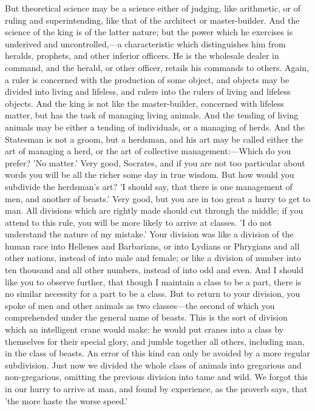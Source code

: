 \documentclass[11pt,letter]{article}
\begin{document}
\par  But theoretical science may be a science either of judging, like arithmetic, or of ruling and superintending, like that of the architect or master-builder. And the science of the king is of the latter nature; but the power which he exercises is underived and uncontrolled,—a characteristic which distinguishes him from heralds, prophets, and other inferior officers. He is the wholesale dealer in command, and the herald, or other officer, retails his commands to others. Again, a ruler is concerned with the production of some object, and objects may be divided into living and lifeless, and rulers into the rulers of living and lifeless objects. And the king is not like the master-builder, concerned with lifeless matter, but has the task of managing living animals. And the tending of living animals may be either a tending of individuals, or a managing of herds. And the Statesman is not a groom, but a herdsman, and his art may be called either the art of managing a herd, or the art of collective management:—Which do you prefer? 'No matter.' Very good, Socrates, and if you are not too particular about words you will be all the richer some day in true wisdom. But how would you subdivide the herdsman's art? 'I should say, that there is one management of men, and another of beasts.' Very good, but you are in too great a hurry to get to man. All divisions which are rightly made should cut through the middle; if you attend to this rule, you will be more likely to arrive at classes. 'I do not understand the nature of my mistake.' Your division was like a division of the human race into Hellenes and Barbarians, or into Lydians or Phrygians and all other nations, instead of into male and female; or like a division of number into ten thousand and all other numbers, instead of into odd and even. And I should like you to observe further, that though I maintain a class to be a part, there is no similar necessity for a part to be a class. But to return to your division, you spoke of men and other animals as two classes—the second of which you comprehended under the general name of beasts. This is the sort of division which an intelligent crane would make: he would put cranes into a class by themselves for their special glory, and jumble together all others, including man, in the class of beasts. An error of this kind can only be avoided by a more regular subdivision. Just now we divided the whole class of animals into gregarious and non-gregarious, omitting the previous division into tame and wild. We forgot this in our hurry to arrive at man, and found by experience, as the proverb says, that 'the more haste the worse speed.'
\end{document}
